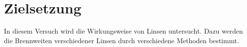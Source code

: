 \section{Zielsetzung}
\label{sec:Zielsetzung}

In diesem Versuch wird die Wirkungsweise von Linsen untersucht.
Dazu werden die Brennweiten verschiedener Linsen durch verschiedene Methoden bestimmt.